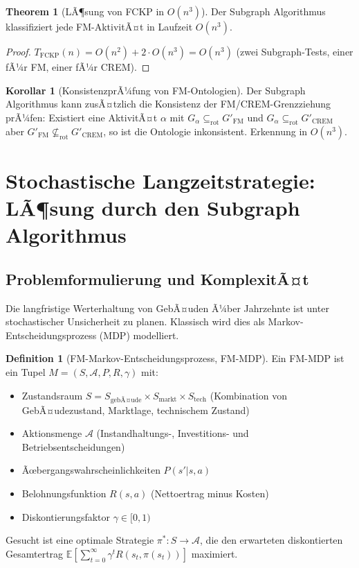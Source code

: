 ﻿\documentclass[a4paper,12pt]{article}
\theoremstyle{definition}
\newtheorem{definition}{Definition}[section]
\newtheorem{korollar}{Korollar}[section]
\newtheorem{theorem}{Theorem}[section]
\begin{document}
\begin{theorem}[LÃ¶sung von FCKP in $O(n^3)$]
\label{thm:fckp-sol}
Der Subgraph Algorithmus klassifiziert jede FM-AktivitÃ¤t in Laufzeit $O(n^3)$.
\end{theorem}

\begin{proof}
$T_{\mathrm{FCKP}}(n) = O(n^2) + 2 \cdot O(n^3) = O(n^3)$
(zwei Subgraph-Tests, einer fÃ¼r FM, einer fÃ¼r CREM).
\end{proof}

\begin{korollar}[KonsistenzprÃ¼fung von FM-Ontologien]
\label{kor:onto-konsistenz}
Der Subgraph Algorithmus kann zusÃ¤tzlich die Konsistenz der FM/CREM-Grenzziehung
prÃ¼fen: Existiert eine AktivitÃ¤t $\alpha$ mit $G_{\alpha} \subseteq_{\mathrm{rot}} G'_{\mathrm{FM}}$
und $G_{\alpha} \subseteq_{\mathrm{rot}} G'_{\mathrm{CREM}}$ aber $G'_{\mathrm{FM}} \not\subseteq_{\mathrm{rot}} G'_{\mathrm{CREM}}$,
so ist die Ontologie inkonsistent. Erkennung in $O(n^3)$.
\end{korollar}

\section{Stochastische Langzeitstrategie: LÃ¶sung durch den Subgraph Algorithmus}
\label{sec:mdp}

\subsection{Problemformulierung und KomplexitÃ¤t}

Die langfristige Werterhaltung von GebÃ¤uden Ã¼ber Jahrzehnte ist unter
stochastischer Unsicherheit zu planen. Klassisch wird dies als Markov-Entscheidungsprozess
(MDP) modelliert.

\begin{definition}[FM-Markov-Entscheidungsprozess, FM-MDP]
\label{def:fmmdp}
Ein FM-MDP ist ein Tupel $M = (S, \mathcal{A}, P, R, \gamma)$ mit:
\begin{itemize}
    \item Zustandsraum $S = S_{\text{gebÃ¤ude}} \times S_{\text{markt}} \times S_{\text{tech}}$
          (Kombination von GebÃ¤udezustand, Marktlage, technischem Zustand)
    \item Aktionsmenge $\mathcal{A}$ (Instandhaltungs-, Investitions- und Betriebsentscheidungen)
    \item Ãœbergangswahrscheinlichkeiten $P(s' | s, a)$
    \item Belohnungsfunktion $R(s, a)$ (Nettoertrag minus Kosten)
    \item Diskontierungsfaktor $\gamma \in [0,1)$
\end{itemize}
Gesucht ist eine optimale Strategie $\pi^*: S \to \mathcal{A}$, die den erwarteten
diskontierten Gesamtertrag $\mathbb{E}[\sum_{t=0}^{\infty} \gamma^t R(s_t, \pi(s_t))]$
maximiert.
\end{definition}
\end{document}
